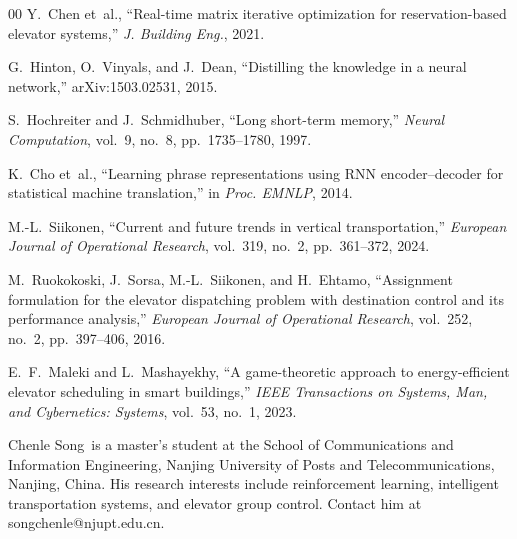 \documentclass{IEEEcsmag}
\begin{document}
\begin{thebibliography}{00}
Y.~Chen et~al., ``Real-time matrix iterative optimization for
reservation-based elevator systems,'' \textit{J. Building Eng.},
2021.

G.~Hinton, O.~Vinyals, and J.~Dean, ``Distilling the knowledge in a
neural network,'' arXiv:1503.02531, 2015.

S.~Hochreiter and J.~Schmidhuber, ``Long short-term memory,''
\textit{Neural Computation}, vol.~9, no.~8, pp.~1735--1780, 1997.

K.~Cho et~al., ``Learning phrase representations using RNN
encoder--decoder for statistical machine translation,'' in
\textit{Proc. EMNLP}, 2014.


M.-L.~Siikonen, ``Current and future trends in vertical
transportation,'' \textit{European Journal of Operational Research},
vol.~319, no.~2, pp.~361--372, 2024.

M.~Ruokokoski, J.~Sorsa, M.-L.~Siikonen, and H.~Ehtamo,
``Assignment formulation for the elevator dispatching problem with
destination control and its performance analysis,'' \textit{European
Journal of Operational Research}, vol.~252, no.~2, pp.~397--406,
2016.

E.~F.~Maleki and L.~Mashayekhy, ``A game-theoretic approach to
energy-efficient elevator scheduling in smart buildings,''
\textit{IEEE Transactions on Systems, Man, and Cybernetics:
Systems}, vol.~53, no.~1, 2023.

\end{thebibliography}

\begin{IEEEbiography}{Chenle Song}{\,} is a master's student at the
School of Communications and Information Engineering, Nanjing
University of Posts and Telecommunications, Nanjing, China. His
research interests include reinforcement learning, intelligent
transportation systems, and elevator group control. Contact him at
songchenle@njupt.edu.cn.

\end{IEEEbiography}
\end{document}
